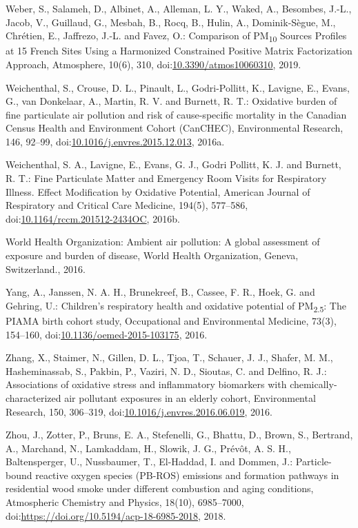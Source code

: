 \documentclass[
]{article}
\begin{document}
Weber, S., Salameh, D., Albinet, A., Alleman, L. Y., Waked, A.,
Besombes, J.-L., Jacob, V., Guillaud, G., Mesbah, B., Rocq, B., Hulin,
A., Dominik-Sègue, M., Chrétien, E., Jaffrezo, J.-L. and Favez, O.:
Comparison of PM\textsubscript{10} Sources Profiles at 15 French Sites
Using a Harmonized Constrained Positive Matrix Factorization Approach,
Atmosphere, 10(6), 310,
doi:\href{https://doi.org/10.3390/atmos10060310}{10.3390/atmos10060310},
2019.

Weichenthal, S., Crouse, D. L., Pinault, L., Godri-Pollitt, K., Lavigne,
E., Evans, G., van Donkelaar, A., Martin, R. V. and Burnett, R. T.:
Oxidative burden of fine particulate air pollution and risk of
cause-specific mortality in the Canadian Census Health and Environment
Cohort (CanCHEC), Environmental Research, 146, 92--99,
doi:\href{https://doi.org/10.1016/j.envres.2015.12.013}{10.1016/j.envres.2015.12.013},
2016a.

Weichenthal, S. A., Lavigne, E., Evans, G. J., Godri Pollitt, K. J. and
Burnett, R. T.: Fine Particulate Matter and Emergency Room Visits for
Respiratory Illness. Effect Modification by Oxidative Potential,
American Journal of Respiratory and Critical Care Medicine, 194(5),
577--586,
doi:\href{https://doi.org/10.1164/rccm.201512-2434OC}{10.1164/rccm.201512-2434OC},
2016b.

World Health Organization: Ambient air pollution: A global assessment of
exposure and burden of disease, World Health Organization, Geneva,
Switzerland., 2016.

Yang, A., Janssen, N. A. H., Brunekreef, B., Cassee, F. R., Hoek, G. and
Gehring, U.: Children's respiratory health and oxidative potential of
PM\textsubscript{2.5}: The PIAMA birth cohort study, Occupational and
Environmental Medicine, 73(3), 154--160,
doi:\href{https://doi.org/10.1136/oemed-2015-103175}{10.1136/oemed-2015-103175},
2016.

Zhang, X., Staimer, N., Gillen, D. L., Tjoa, T., Schauer, J. J., Shafer,
M. M., Hasheminassab, S., Pakbin, P., Vaziri, N. D., Sioutas, C. and
Delfino, R. J.: Associations of oxidative stress and inflammatory
biomarkers with chemically-characterized air pollutant exposures in an
elderly cohort, Environmental Research, 150, 306--319,
doi:\href{https://doi.org/10.1016/j.envres.2016.06.019}{10.1016/j.envres.2016.06.019},
2016.

Zhou, J., Zotter, P., Bruns, E. A., Stefenelli, G., Bhattu, D., Brown,
S., Bertrand, A., Marchand, N., Lamkaddam, H., Slowik, J. G., Prévôt, A.
S. H., Baltensperger, U., Nussbaumer, T., El-Haddad, I. and Dommen, J.:
Particle-bound reactive oxygen species (PB-ROS) emissions and formation
pathways in residential wood smoke under different combustion and aging
conditions, Atmospheric Chemistry and Physics, 18(10), 6985--7000,
doi:\href{https://doi.org/https://doi.org/10.5194/acp-18-6985-2018}{https://doi.org/10.5194/acp-18-6985-2018},
2018.
\end{document}
